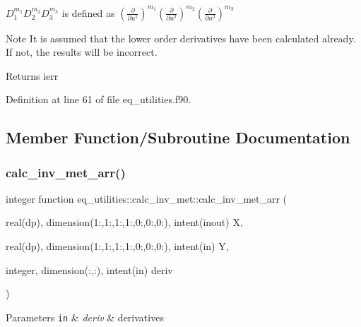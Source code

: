 $D_1^{m_1} D_2^{m_2} D_3^{m_3} $ is defined as $\left(\frac{\partial}{\partial u^1}\right)^{m_1} \left(\frac{\partial}{\partial u^2}\right)^{m_2} \left(\frac{\partial}{\partial u^3}\right)^{m_3} $

\begin{DoxyNote}{Note}
It is assumed that the lower order derivatives have been calculated already. If not, the results will be incorrect.
\end{DoxyNote}
\begin{DoxyReturn}{Returns}
ierr 
\end{DoxyReturn}


Definition at line 61 of file eq\+\_\+utilities.\+f90.



\subsection{Member Function/\+Subroutine Documentation}
\mbox{\label{interfaceeq__utilities_1_1calc__inv__met_a82b49d5a135cc6bdd47fd3e95af3ed38}} 
\subsubsection{\texorpdfstring{calc\+\_\+inv\+\_\+met\+\_\+arr()}{calc\_inv\_met\_arr()}}
{\footnotesize\ttfamily integer function eq\+\_\+utilities\+::calc\+\_\+inv\+\_\+met\+::calc\+\_\+inv\+\_\+met\+\_\+arr (\begin{DoxyParamCaption}\item[{real(dp), dimension(1\+:,1\+:,1\+:,1\+:,0\+:,0\+:,0\+:), intent(inout)}]{X,  }\item[{real(dp), dimension(1\+:,1\+:,1\+:,1\+:,0\+:,0\+:,0\+:), intent(in)}]{Y,  }\item[{integer, dimension(\+:,\+:), intent(in)}]{deriv }\end{DoxyParamCaption})}


\begin{DoxyParams}[1]{Parameters}
\mbox{\tt in}  & {\em deriv} & derivatives \\
\hline
\end{DoxyParams}


